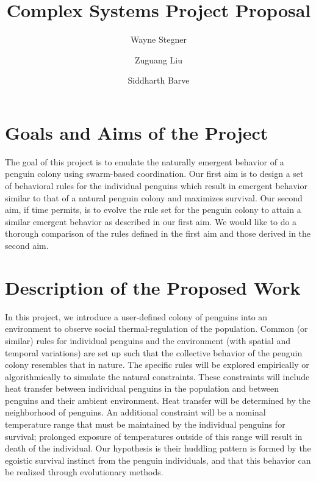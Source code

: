 \documentclass[12pt]{article}
\title{Complex Systems Project Proposal}
\author{
	Wayne Stegner %
	\and
	Zuguang Liu
	\and
	Siddharth Barve
}
\date{\vspace{-36pt}}
\begin{document}
	\maketitle

	\vspace{-10pt}
	\section*{Goals and Aims of the Project}
	\vspace{-6pt}
	\par The goal of this project is to emulate the naturally emergent behavior
	of a penguin colony using swarm-based coordination.
	Our first aim is to design a set of behavioral rules for the individual
	penguins which result in emergent behavior similar to that of a natural
	penguin colony and maximizes survival.
	Our second aim, if time permits, is to evolve the rule set for the penguin
	colony to attain a similar emergent behavior as described in our first aim.
	We would like to do a thorough comparison of the rules defined in the first
	aim and those derived in the second aim.

	\vspace{-10pt}
	\section*{Description of the Proposed Work}
	\vspace{-6pt}
	\par In this project, we introduce a user-defined colony of penguins into
	an environment to observe social thermal-regulation of the population.
	Common (or similar) rules for individual penguins and the environment (with
	spatial and temporal variations) are set up such that the collective
	behavior of the penguin colony resembles that in nature.
	The specific rules will be explored empirically or algorithmically to
	simulate the natural constraints.
	These constraints will include heat transfer between individual penguins in
	the population and between penguins and their ambient environment.
	Heat transfer will be determined by the neighborhood of penguins.
	An additional constraint will be a nominal temperature range that must be
	maintained by the individual penguins for survival; prolonged exposure of
	temperatures outside of this range will result in death of the individual.
	Our hypothesis is their huddling pattern is formed by the egoistic survival
	instinct from the penguin individuals, and that this behavior can be
	realized through evolutionary methods.
\end{document}
